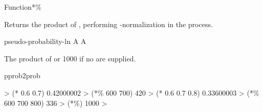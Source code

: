 \documentclass[10pt,twoside,english,pdftex]{article}
\begin{document}
\begin{functiondoc}{Function}{*\%}%
  {
    }
%

\fnsyntax

\fnpurpose Returns the product of , performing
-normalization in the process.

\fnpackage {}

\fnmodule {}

\fnargs
\begin{args}{pseudo-probability-ln}
 A  
 A 
\end{args}

\fnreturns The   product of
 or 1000 if no  are supplied.

\begin{alsos}{pprob2prob}
\also[/\%]
\end{alsos}

\fnexamples
\begin{example}
%
\W\supp
  > (* 0.6 0.7)
  0.42000002
  > (*\% 600 700)
  420
  > (* 0.6 0.7 0.8)
  0.33600003
  > (*\% 600 700 800)
  336
  > (*\%)
  1000
  > 
\end{example}

\end{functiondoc}

\end{document}
